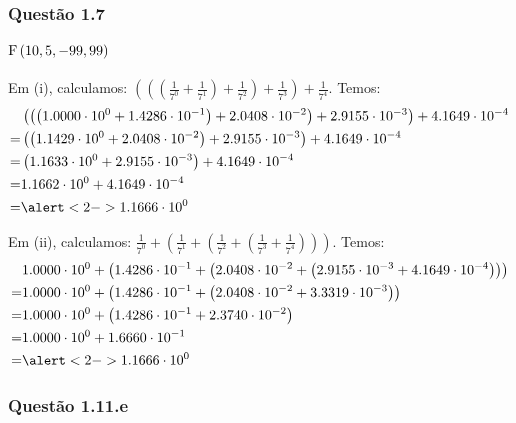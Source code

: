 \begin{frame}
\frametitle{Questão 1.7}
\framesubtitle{$\mathrm{F}\left(10,5,-99,99\right)$}

Em (i), calculamos: $\left(\left(\left(\frac{1}{7^0} + \frac{1}{7^1}\right) +
\frac{1}{7^2}\right) + \frac{1}{7^3}\right) + \frac{1}{7^4}$.
%
Temos:
{\tiny
\begin{align*}
  & 
  \left(
    \left(
      \left(\machinenumber{1.0000}{0} + \machinenumber{1.4286}{-1}\right) +
      \machinenumber{2.0408}{-2}
    \right) +
    \machinenumber{2.9155}{-3}
  \right) +
  \machinenumber{4.1649}{-4}\\
= &
  \left(
    \left(
      \machinenumber{1.1429}{0} + \machinenumber{2.0408}{-2}
    \right) +
    \machinenumber{2.9155}{-3}
  \right) +
  \machinenumber{4.1649}{-4}\\
= &
  \left(
      \machinenumber{1.1633}{0} + \machinenumber{2.9155}{-3}
  \right) +
  \machinenumber{4.1649}{-4}\\
= & \machinenumber{1.1662}{0} + \machinenumber{4.1649}{-4}\\
= & \alert<2->{\machinenumber{1.1666}{0}}
\end{align*}
}

Em (ii), calculamos: $\frac{1}{7^0} + \left(\frac{1}{7^1} +
\left(\frac{1}{7^2} + \left(\frac{1}{7^3} + \frac{1}{7^4}\right)\right)\right)$.
%
Temos:
{\tiny
\begin{align*}
  & 
  \machinenumber{1.0000}{0} + \left(\machinenumber{1.4286}{-1} +
  \left(\machinenumber{2.0408}{-2} + \left(\machinenumber{2.9155}{-3} +
  \machinenumber{4.1649}{-4}\right)\right)\right)\\
%
  =& 
  \machinenumber{1.0000}{0} + 
  \left(\machinenumber{1.4286}{-1} +
    \left(\machinenumber{2.0408}{-2} + 
      \machinenumber{3.3319}{-3}
    \right)
  \right)\\
  =& 
  \machinenumber{1.0000}{0} + 
  \left(\machinenumber{1.4286}{-1} +
    \machinenumber{2.3740}{-2}  
  \right)\\
  =& \machinenumber{1.0000}{0} + \machinenumber{1.6660}{-1} \\
  =& \alert<2->{\machinenumber{1.1666}{0}}
\end{align*}
}

\end{frame}

\subsubsection{Questão 1.11.e}

